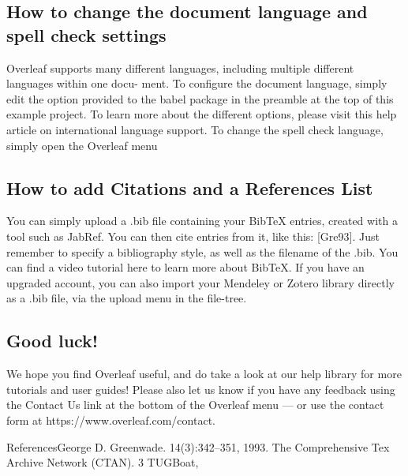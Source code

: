 \documentclass{article}
\begin{document}
\subsection{How to change the document language and spell check settings}
Overleaf supports many different languages, including multiple different languages within one docu-
ment.
To configure the document language, simply edit the option provided to the babel package in the
preamble at the top of this example project. To learn more about the different options, please visit
this help article on international language support.
To change the spell check language, simply open the Overleaf menu

\subsection{How to add Citations and a References List}
You can simply upload a .bib file containing your BibTeX entries, created with a tool such as JabRef.
You can then cite entries from it, like this: [Gre93]. Just remember to specify a bibliography style, as
well as the filename of the .bib. You can find a video tutorial here to learn more about BibTeX.
If you have an upgraded account, you can also import your Mendeley or Zotero library directly as
a .bib file, via the upload menu in the file-tree.

\subsection{Good luck!}
We hope you find Overleaf useful, and do take a look at our help library for more tutorials and user
guides! Please also let us know if you have any feedback using the Contact Us link at the bottom of
the Overleaf menu — or use the contact form at https://www.overleaf.com/contact.\newline

{\huge References}\newline \newline
[Gre93] George D. Greenwade.
14(3):342–351, 1993.
The Comprehensive Tex Archive Network (CTAN).
3
TUGBoat,
\end{document}
